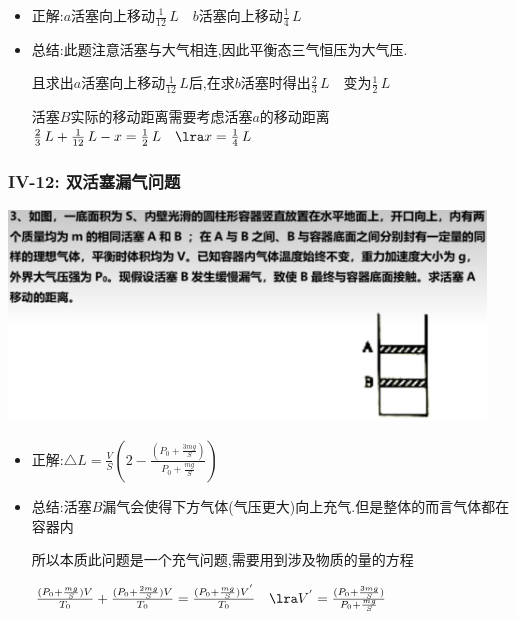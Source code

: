 \documentclass{article}
\begin{document}
\begin{itemize}
    \item 正解:\quad $a$活塞向上移动$\frac{1}{12} \, L \quad b$活塞向上移动$\frac{1}{4} \, L$
    \item 总结:\quad 此题注意活塞与大气相连,因此平衡态三气恒压为大气压.
    
    \hspace{3.2em}且求出$a$活塞向上移动$\frac{1}{12} \, L $后,在求$b$活塞时得出$\frac{2}{3} \, L \quad $变为$\frac{1}{2} \, L $ 

    \hspace{3.2em}活塞$B$实际的移动距离需要考虑活塞$a$的移动距离$ \frac{2}{3} \, L + \frac{1}{12} \, L - x = \frac{1}{2} \, L \quad \lra x = \frac{1}{4} \, L$
\end{itemize}

\vspace{2em}

\subsubsection{IV-12: 双活塞漏气问题}
\includegraphics[width = 0.95\textwidth,keepaspectratio]{./pictures/2.3-24.png}

\begin{itemize}
    \item 正解:\quad $\triangle L = \frac{V}{S}(2 - \frac{(P_{0} + \frac{3mg}{S})}{P_{0} + \frac{mg}{S}})$
    \item 总结:\quad 活塞$B$漏气会使得下方气体(气压更大)向上充气.但是整体的而言气体都在容器内
    
    \hspace{3.2em}所以本质此问题是一个充气问题,需要用到涉及物质的量的方程  
    
    \hspace{3.2em}$\frac{(P_{0} + \frac{mg}{S}) V}{T_{0}} + \frac{(P_{0} + \frac{2mg}{S}) V}{T_{0}} = \frac{(P_{0} + \frac{mg}{S}) V^{'}}{T_{0}}  
    \quad \lra V^{'} = \frac{(P_{0} + \frac{3mg}{S})}{P_{0} + \frac{mg}{S}}$
\end{itemize}
\end{document}
